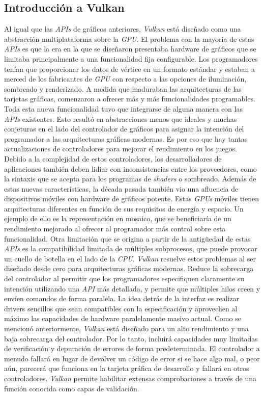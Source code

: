 \documentclass[a4paper]{book}
\begin{document}
\subsection{Introducción a Vulkan}
\label{subsec:IntroVulkan}

Al igual que las \textit{APIs} de gráficos anteriores, \textit{Vulkan} está diseñado como una abstracción multiplataforma
sobre la \textit{GPU}. El problema con la mayoría de estas \textit{APIs} es que la era en la que se diseñaron presentaba
hardware de gráficos que se limitaba principalmente a una funcionalidad fija configurable. Los programadores tenían que
proporcionar los datos de vértice en un formato estándar y estaban a merced de los fabricantes de \textit{GPU} con respecto
a las opciones de iluminación, sombreado y renderizado. A medida que maduraban las arquitecturas de las tarjetas gráficas,
comenzaron a ofrecer más y más funcionalidades programables. Toda esta nueva funcionalidad tuvo que integrarse de alguna manera
con las \textit{APIs} existentes. Esto resultó en abstracciones menos que ideales y muchas conjeturas en el lado del controlador
de gráficos para asignar la intención del programador a las arquitecturas gráficas modernas. Es por eso que hay tantas actualizaciones
de controladores para mejorar el rendimiento en los juegos. Debido a la complejidad de estos controladores, los desarrolladores de aplicaciones
también deben lidiar con inconsistencias entre los proveedores, como la sintaxis que se acepta para los programas de
\textit{shaders} o sombreado.  Además de estas nuevas características, la década pasada también vio una afluencia de dispositivos
móviles con hardware de gráficos potente. Estas \textit{GPUs} móviles tienen arquitecturas diferentes en función de sus requisitos de
energía y espacio. Un ejemplo de ello es la representación en mosaico, que se beneficiaría de un rendimiento mejorado al ofrecer al
programador más control sobre esta funcionalidad. Otra limitación que se origina a partir de la antigüedad de estas \textit{APIs}
es la compatibilidad limitada de múltiples subprocesos, que puede provocar un cuello de botella en el lado de la \textit{CPU}. \textit{Vulkan}
resuelve estos problemas al ser diseñado desde cero para arquitecturas gráficas modernas. Reduce la sobrecarga
del controlador al permitir que los programadores especifiquen claramente su intención utilizando una \textit{API} más detallada,
y permite que múltiples hilos creen y envíen comandos de forma paralela. La idea detrás de la interfaz es realizar drivers
sencillos que sean compatibles con la especificación y aprovechen al máximo las capacidades de hardware paralelamente
masivo actual. Como se mencionó anteriormente, \textit{Vulkan} está diseñado para un alto rendimiento y una baja sobrecarga del controlador.
Por lo tanto, incluirá capacidades muy limitadas de verificación y depuración de errores de forma predeterminada.
El controlador a menudo fallará en lugar de devolver un código de error si se hace algo mal, o peor aún, parecerá que
funciona en la tarjeta gráfica de desarrollo y fallará en otros controladores. \textit{Vulkan} permite habilitar extensas comprobaciones a
través de una función conocida como capas de validación.
\end{document}
